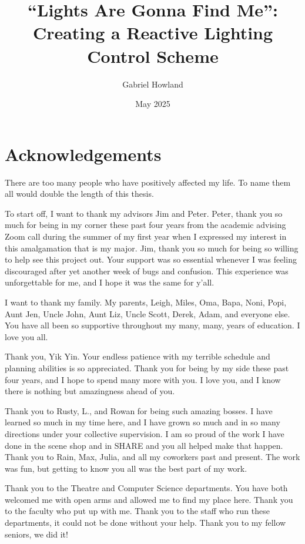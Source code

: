 \documentclass[
    12pt,
    twoside,
    bibstyle=chicago,
    headerstyle=uppercase,
	bibfile=biblatex_updating.bib
]{reedthesis}
\title{``Lights Are Gonna Find Me'': Creating a Reactive Lighting Control Scheme}
\author{Gabriel Howland}
\date{May 2025}
\begin{document}
  \maketitle
  \frontmatter %
  \pagestyle{empty} %

    \chapter*{Acknowledgements}
	There are too many people who have positively affected my life. To name them all would double the length of this thesis.

	To start off, I want to thank my advisors Jim and Peter. Peter, thank you so much for being in my corner these past four years from the academic advising Zoom call during the summer of my first year when I expressed my interest in this amalgamation that is my major. Jim, thank you so much for being so willing to help see this project out. Your support was so essential whenever I was feeling discouraged after yet another week of bugs and confusion. This experience was unforgettable for me, and I hope it was the same for y'all.


	I want to thank my family. My parents, Leigh, Miles, Oma, Bapa, Noni, Popi, Aunt Jen, Uncle John, Aunt Liz, Uncle Scott, Derek, Adam, and everyone else. You have all been so supportive throughout my many, many, years of education. I love you all.

	Thank you, Yik Yin. Your endless patience with my terrible schedule and planning abilities is so appreciated. Thank you for being by my side these past four years, and I hope to spend many more with you. I love you, and I know there is nothing but amazingness ahead of you.

	Thank you to Rusty, L., and Rowan for being such amazing bosses. I have learned so much in my time here, and I have grown so much and in so many directions under your collective supervision. I am so proud of the work I have done in the scene shop and in SHARE and you all helped make that happen. Thank you to Rain, Max, Julia, and all my coworkers past and present. The work was fun, but getting to know you all was the best part of my work.

	Thank you to the Theatre and Computer Science departments. You have both welcomed me with open arms and allowed me to find my place here. Thank you to the faculty who put up with me. Thank you to the staff who run these departments, it could not be done without your help. Thank you to my fellow seniors, we did it!
\end{document}
